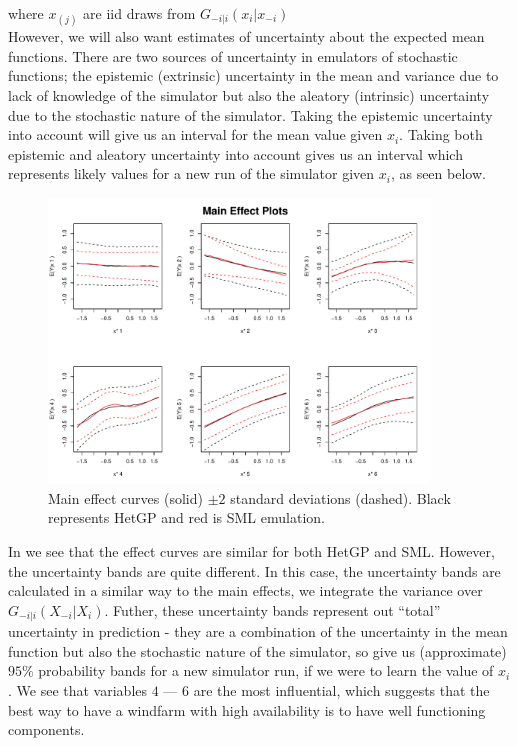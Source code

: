 \documentclass[12pt]{article}
\begin{document}
where $x_{(j)}$ are iid draws from $G_{-i|i}(x_i | x_{-i})$
\\

However, we will also want estimates of uncertainty about the expected mean functions. There are two sources of uncertainty in emulators of stochastic functions; the epistemic (extrinsic) uncertainty in the mean and variance due to lack of knowledge of the simulator but also the aleatory (intrinsic) uncertainty due to the stochastic nature of the simulator. Taking the epistemic uncertainty into account will give us an interval for the mean value given $x_i$. Taking both epistemic and aleatory uncertainty into account gives us an interval which represents likely values for a new run of the simulator given $x_i$, as seen below.\\

\begin{figure}
	\centering
	\includegraphics[width = 0.9\textwidth]{fig/main-effects.pdf}
	\caption{Main effect curves (solid) $\pm 2$ standard deviations (dashed). Black represents HetGP and red is SML emulation.}
	\label{Fig:main-effect}
\end{figure}

In  we see that the effect curves are similar for both HetGP and SML. However, the uncertainty bands are quite different. In this case, the uncertainty bands are calculated in a similar way to the main effects, we integrate the variance over $G_{-i|i}(X_{-i}|X_i)$. Futher, these uncertainty bands represent out ``total'' uncertainty in prediction - they are a combination of the uncertainty in the mean function but also the stochastic nature of the simulator, so give us (approximate) $95\%$ probability bands for a new simulator run, if we were to learn the value of $x_i$. We see that variables $4$ --- $6$ are the most influential, which suggests that the best way to have a windfarm with high availability is to have well functioning components.
\end{document}
